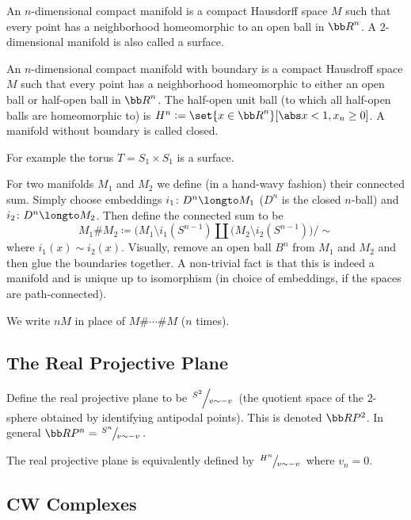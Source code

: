 \bdefn

    An {\emphcolor $n$-dimensional compact manifold} is a compact Hausdorff space $M$ such that every point has a neighborhood homeomorphic to an open ball in ${\bb R}^n$.
    A $2$-dimensional manifold is also called a {\emphcolor surface}.

    An {\emphcolor $n$-dimensional compact manifold with boundary} is a compact Hausdroff space $M$ such that every point has a neighborhood homeomorphic to either an open ball or half-open ball in
    ${\bb R}^n$.
    The half-open unit ball (to which all half-open balls are homeomorphic to) is $H^n\coloneqq\set{x\in{\bb R}^n}[\abs x<1,x_n\geq0]$.
    A manifold without boundary is called {\emphcolor closed}.

\edefn

For example the torus $T=S_1\times S_1$ is a surface.

For two manifolds $M_1$ and $M_2$ we define (in a hand-wavy fashion) their connected sum.
Simply choose embeddings $i_1\colon D^n\longto M_1$ ($D^n$ is the closed $n$-ball) and $i_2\colon D^n\longto M_2$.
Then define the connected sum to be
$$ M_1\#M_2\coloneqq\bigl(M_1\setminus i_1(S^{n-1})\amalg(M_2\setminus i_2(S^{n-1})\bigr)/{\sim} $$
where $i_1(x)\sim i_2(x)$.
Visually, remove an open ball $B^n$ from $M_1$ and $M_2$ and then glue the boundaries together.
A non-trivial fact is that this is indeed a manifold and is unique up to isomorphism (in choice of embeddings, if the spaces are path-connected).

We write $nM$ in place of $M\#\cdots\#M$ ($n$ times).

\subsection{The Real Projective Plane}

\bdefn

    Define the {\emphcolor real projective plane} to be $\slfrac{S^2}{v\sim-v}$ (the quotient space of the $2$-sphere obtained by identifying antipodal points).
    This is denoted ${\bb R}P^2$.
    In general ${\bb R}P^n=\slfrac{S^n}{v\sim-v}$.

\edefn

The real projective plane is equivalently defined by $\slfrac{H^n}{v\sim-v}$ where $v_n=0$.

\subsection{CW Complexes}

